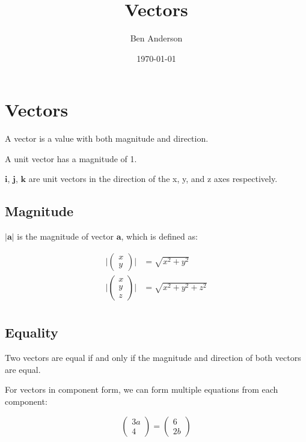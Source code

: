\documentclass[a4paper,11pt]{article}
\newcommand{\bb}{\boldsymbol}
\begin{document}
\title{Vectors}
\author{Ben Anderson}
\date{\today}
\maketitle
\pagebreak

\tableofcontents
\pagebreak




\section{Vectors}

A vector is a value with both magnitude and direction.

A unit vector has a magnitude of 1.

$\bb{i}$, $\bb{j}$, $\bb{k}$ are unit vectors in the direction of the x, y, and z axes respectively.


\subsection{Magnitude}

$|\bb{a}|$ is the magnitude of vector $\bb{a}$, which is defined as:

$$
\begin{aligned}
\lvert \begin{pmatrix} x \\ y \end{pmatrix} \rvert & = \sqrt{x^2 + y^2} \\
\lvert \begin{pmatrix} x \\ y \\ z \end{pmatrix} \rvert & = \sqrt{x^2 + y^2 + z^2} \\
\end{aligned}
$$


\subsection{Equality}

Two vectors are equal if and only if the magnitude and direction of both vectors
are equal.

For vectors in component form, we can form multiple equations from each
component:

$$
\begin{pmatrix} 3a \\ 4 \end{pmatrix} = \begin{pmatrix} 6 \\ 2b \end{pmatrix}
$$
\end{document}
